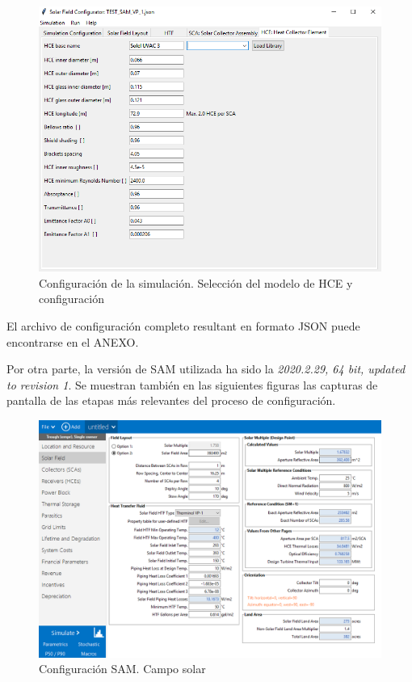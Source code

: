\begin{figure}
\includegraphics[scale=0.8]{images/interface05.png}
\caption{Configuración de la simulación. Selección del modelo de HCE y configuración} 
\label{fig:interface05}
\end{figure}

El archivo de configuración completo resultant en formato JSON puede
encontrarse en el ANEXO.

Por otra parte, la versión de SAM utilizada ha sido la \emph{2020.2.29,
64 bit, updated to revision 1}. Se muestran también en las siguientes
figuras las capturas de pantalla de las etapas más relevantes del
proceso de configuración.

\begin{figure}
\includegraphics[scale=0.8]{images/captura_sam01.png}
\caption{Configuración SAM. Campo solar} 
\label{fig:captura01}
\end{figure}

